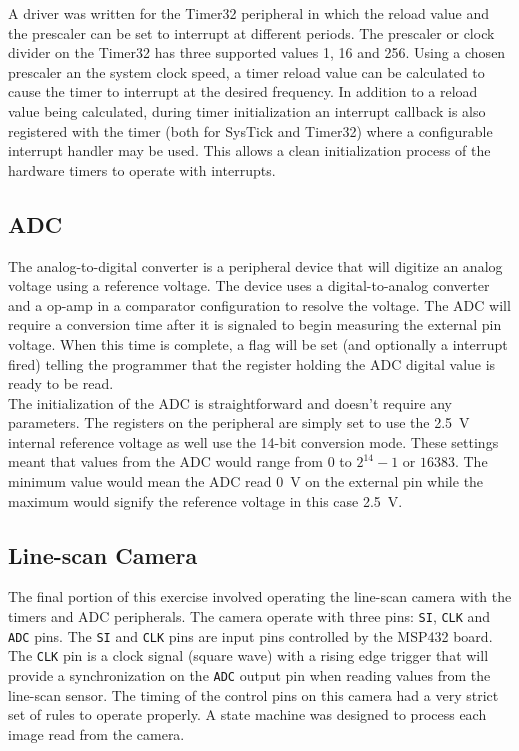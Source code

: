 \documentclass[CMPE]{../KGCOEReport}
\def\code#1{\texttt{#1}}
\begin{document}
	A driver was written for the Timer32 peripheral in which the reload value and the
	prescaler can be set to interrupt at different periods. The prescaler or clock
	divider on the Timer32 has three supported values 1, 16 and 256.
	Using a chosen prescaler an the system clock speed, a timer reload value can be
	calculated to cause the timer to interrupt at the desired frequency. In addition to
	a reload value being calculated, during timer initialization an interrupt callback
	is also registered with the timer (both for SysTick and Timer32) where a configurable
	interrupt handler may be used. This allows a clean initialization process of the
	hardware timers to operate with interrupts.

    \subsection*{ADC}

	The analog-to-digital converter is a peripheral device that will digitize an analog
	voltage using a reference voltage. The device uses a digital-to-analog converter
	and a op-amp in a comparator configuration to resolve the voltage. The ADC will
	require a conversion time after it is signaled to begin measuring the external pin
	voltage. When this time is complete, a flag will be set (and optionally a
	interrupt fired) telling the programmer that the register holding the ADC digital
	value is ready to be read.\\

	The initialization of the ADC is straightforward and doesn't require any parameters.
	The registers on the peripheral are simply set to use the \SI{2.5}{\volt} internal 
	reference voltage as well use the 14-bit conversion mode. These settings meant that
	values from the ADC would range from $0$ to $2^{14} - 1$ or $16383$. The minimum value
	would mean the ADC read \SI{0}{\volt} on the external pin while the maximum would
	signify the reference voltage in this case \SI{2.5}{\volt}.

	\subsection*{Line-scan Camera}

	The final portion of this exercise involved operating the line-scan camera with the
	timers and ADC peripherals. The camera operate with three pins:
	\code{SI}, \code{CLK} and \code{ADC} pins. The \code{SI} and \code{CLK} pins
	are input pins controlled by the MSP432 board. The \code{CLK} pin is a clock
	signal (square wave) with a rising edge trigger that will provide a synchronization
	on the \code{ADC} output pin when reading values from the line-scan sensor.
	The timing of the control pins on this camera had a very strict set of rules to
	operate properly. A state machine was designed to process each image read from
	the camera.
\end{document}
